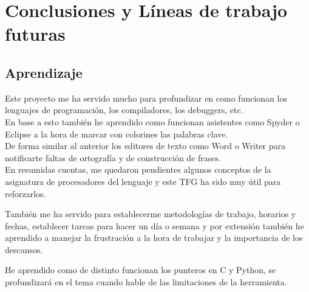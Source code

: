 \chapter{Conclusiones y Líneas de trabajo futuras}

\section{Aprendizaje}
Este proyecto me ha servido mucho para profundizar en como funcionan los lenguajes de programación, los compiladores, los debuggers, etc.\\
En base a esto también he aprendido como funcionan asistentes como Spyder o Eclipse a la hora de marcar con colorines las palabras clave.\\
De forma similar al anterior los editores de texto como Word o Writer para notificarte faltas de ortografía y de construcción de frases.\\
En resumidas cuentas, me quedaron pendientes algunos conceptos de la asignatura de procesadores del lenguaje y este TFG ha sido muy útil para reforzarlos.

También me ha servido para establecerme metodologías de trabajo, horarios y fechas, establecer tareas para hacer un día o semana y por extensión también he aprendido a manejar la frustración a la hora de trabajar y la importancia de los descansos.

He aprendido como de distinto funcionan los punteros en C y Python, se profundizará en el tema cuando hable de las limitaciones de la herramienta.

